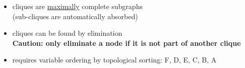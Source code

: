 \begin{frame} \frametitle{\subsecname
}
					\slidesonly{\vspace{5mm}}
				\begin{itemize}
					\item cliques are \underline{maximally} complete subgraphs\\
					(sub-cliques are automatically absorbed)
					\item cliques can be found by elimination \\
					\slidesonly{\vspace{10mm}}
					\textbf{Caution: only eliminate a node if it is not part of another clique}
					\slidesonly{\vspace{5mm}}
					\item requires variable ordering by topological sorting: 
						F, D, E, C, B, A
				\end{itemize}
	
	
	

\end{frame}

